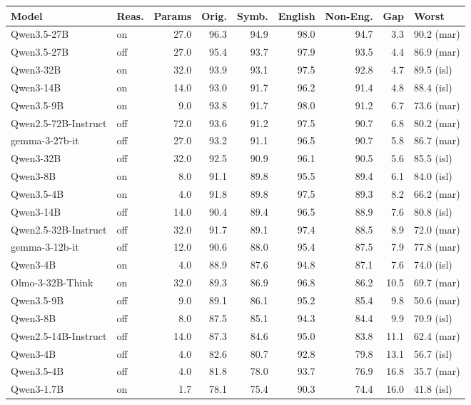 \begin{table}[p]
\centering
\small
\begin{tabular}{llrrrrrrl}
\toprule
Model & Reas. & Params & Orig. & Symb. & English & Non-Eng. & Gap & Worst \\
\midrule
Qwen3.5-27B & on & 27.0 & 96.3 & 94.9 & 98.0 & 94.7 & 3.3 & 90.2 (mar) \\
Qwen3.5-27B & off & 27.0 & 95.4 & 93.7 & 97.9 & 93.5 & 4.4 & 86.9 (mar) \\
Qwen3-32B & on & 32.0 & 93.9 & 93.1 & 97.5 & 92.8 & 4.7 & 89.5 (isl) \\
Qwen3-14B & on & 14.0 & 93.0 & 91.7 & 96.2 & 91.4 & 4.8 & 88.4 (isl) \\
Qwen3.5-9B & on & 9.0 & 93.8 & 91.7 & 98.0 & 91.2 & 6.7 & 73.6 (mar) \\
Qwen2.5-72B-Instruct & off & 72.0 & 93.6 & 91.2 & 97.5 & 90.7 & 6.8 & 80.2 (mar) \\
gemma-3-27b-it & off & 27.0 & 93.2 & 91.1 & 96.5 & 90.7 & 5.8 & 86.7 (mar) \\
Qwen3-32B & off & 32.0 & 92.5 & 90.9 & 96.1 & 90.5 & 5.6 & 85.5 (isl) \\
Qwen3-8B & on & 8.0 & 91.1 & 89.8 & 95.5 & 89.4 & 6.1 & 84.0 (isl) \\
Qwen3.5-4B & on & 4.0 & 91.8 & 89.8 & 97.5 & 89.3 & 8.2 & 66.2 (mar) \\
Qwen3-14B & off & 14.0 & 90.4 & 89.4 & 96.5 & 88.9 & 7.6 & 80.8 (isl) \\
Qwen2.5-32B-Instruct & off & 32.0 & 91.7 & 89.1 & 97.4 & 88.5 & 8.9 & 72.0 (mar) \\
gemma-3-12b-it & off & 12.0 & 90.6 & 88.0 & 95.4 & 87.5 & 7.9 & 77.8 (mar) \\
Qwen3-4B & on & 4.0 & 88.9 & 87.6 & 94.8 & 87.1 & 7.6 & 74.0 (isl) \\
Olmo-3-32B-Think & on & 32.0 & 89.3 & 86.9 & 96.8 & 86.2 & 10.5 & 69.7 (mar) \\
Qwen3.5-9B & off & 9.0 & 89.1 & 86.1 & 95.2 & 85.4 & 9.8 & 50.6 (mar) \\
Qwen3-8B & off & 8.0 & 87.5 & 85.1 & 94.3 & 84.4 & 9.9 & 70.9 (isl) \\
Qwen2.5-14B-Instruct & off & 14.0 & 87.3 & 84.6 & 95.0 & 83.8 & 11.1 & 62.4 (mar) \\
Qwen3-4B & off & 4.0 & 82.6 & 80.7 & 92.8 & 79.8 & 13.1 & 56.7 (isl) \\
Qwen3.5-4B & off & 4.0 & 81.8 & 78.0 & 93.7 & 76.9 & 16.8 & 35.7 (mar) \\
Qwen3-1.7B & on & 1.7 & 78.1 & 75.4 & 90.3 & 74.4 & 16.0 & 41.8 (isl) \\

\end{tabular}
\end{table}
